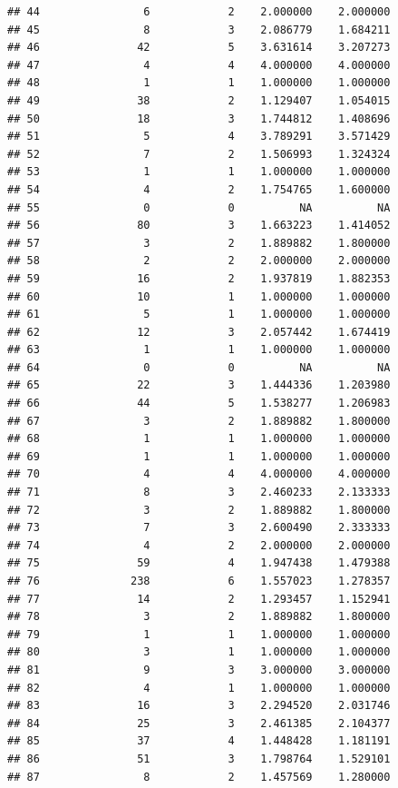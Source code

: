 \documentclass[
]{article}
\begin{document}
\begin{verbatim}
## 44                6            2    2.000000    2.000000
## 45                8            3    2.086779    1.684211
## 46               42            5    3.631614    3.207273
## 47                4            4    4.000000    4.000000
## 48                1            1    1.000000    1.000000
## 49               38            2    1.129407    1.054015
## 50               18            3    1.744812    1.408696
## 51                5            4    3.789291    3.571429
## 52                7            2    1.506993    1.324324
## 53                1            1    1.000000    1.000000
## 54                4            2    1.754765    1.600000
## 55                0            0          NA          NA
## 56               80            3    1.663223    1.414052
## 57                3            2    1.889882    1.800000
## 58                2            2    2.000000    2.000000
## 59               16            2    1.937819    1.882353
## 60               10            1    1.000000    1.000000
## 61                5            1    1.000000    1.000000
## 62               12            3    2.057442    1.674419
## 63                1            1    1.000000    1.000000
## 64                0            0          NA          NA
## 65               22            3    1.444336    1.203980
## 66               44            5    1.538277    1.206983
## 67                3            2    1.889882    1.800000
## 68                1            1    1.000000    1.000000
## 69                1            1    1.000000    1.000000
## 70                4            4    4.000000    4.000000
## 71                8            3    2.460233    2.133333
## 72                3            2    1.889882    1.800000
## 73                7            3    2.600490    2.333333
## 74                4            2    2.000000    2.000000
## 75               59            4    1.947438    1.479388
## 76              238            6    1.557023    1.278357
## 77               14            2    1.293457    1.152941
## 78                3            2    1.889882    1.800000
## 79                1            1    1.000000    1.000000
## 80                3            1    1.000000    1.000000
## 81                9            3    3.000000    3.000000
## 82                4            1    1.000000    1.000000
## 83               16            3    2.294520    2.031746
## 84               25            3    2.461385    2.104377
## 85               37            4    1.448428    1.181191
## 86               51            3    1.798764    1.529101
## 87                8            2    1.457569    1.280000

\end{verbatim}
\end{document}
